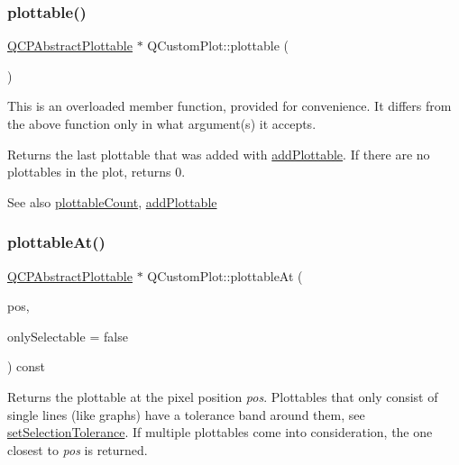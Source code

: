 \subsubsection{\texorpdfstring{plottable()}{plottable()}\hspace{0.1cm}{\footnotesize\ttfamily [2/2]}}
{\footnotesize\ttfamily \mbox{\hyperlink{class_q_c_p_abstract_plottable}{Q\+C\+P\+Abstract\+Plottable}} $\ast$ Q\+Custom\+Plot\+::plottable (\begin{DoxyParamCaption}{ }\end{DoxyParamCaption})}

This is an overloaded member function, provided for convenience. It differs from the above function only in what argument(s) it accepts.

Returns the last plottable that was added with \mbox{\hyperlink{class_q_custom_plot_ab7ad9174f701f9c6f64e378df77927a6}{add\+Plottable}}. If there are no plottables in the plot, returns 0.

\begin{DoxySeeAlso}{See also}
\mbox{\hyperlink{class_q_custom_plot_a5f4f15991c14bf9ad659bb2a19dfbed4}{plottable\+Count}}, \mbox{\hyperlink{class_q_custom_plot_ab7ad9174f701f9c6f64e378df77927a6}{add\+Plottable}} 
\end{DoxySeeAlso}
\mbox{\label{class_q_custom_plot_acddbbd8b16dd633f0d94e5a736fbd8cf}} 
\subsubsection{\texorpdfstring{plottable\+At()}{plottableAt()}}
{\footnotesize\ttfamily \mbox{\hyperlink{class_q_c_p_abstract_plottable}{Q\+C\+P\+Abstract\+Plottable}} $\ast$ Q\+Custom\+Plot\+::plottable\+At (\begin{DoxyParamCaption}\item[{const Q\+PointF \&}]{pos,  }\item[{bool}]{only\+Selectable = {\ttfamily false} }\end{DoxyParamCaption}) const}

Returns the plottable at the pixel position {\itshape pos}. Plottables that only consist of single lines (like graphs) have a tolerance band around them, see \mbox{\hyperlink{class_q_custom_plot_a4dc31241d7b09680950e19e5f971ed93}{set\+Selection\+Tolerance}}. If multiple plottables come into consideration, the one closest to {\itshape pos} is returned.

